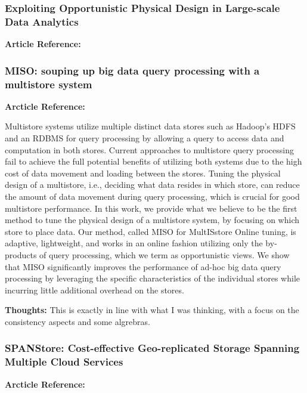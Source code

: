 \documentclass{article}
\begin{document}
\subsubsection{Exploiting Opportunistic Physical Design in Large-scale
               Data Analytics}

\textbf{Article Reference:} \cite{DBLP:journals/corr/abs-1303-6609}

\subsubsection{MISO: souping up big data query processing with a multistore system}

\textbf{Arcticle Reference:} \cite{LeFevre:2014:MSU:2588555.2588568}

Multistore systems utilize multiple distinct data stores such as Hadoop's HDFS and an RDBMS for query processing by allowing a query to access data and computation in both stores. Current approaches to multistore query processing fail to achieve the full potential benefits of utilizing both systems due to the high cost of data movement and loading between the stores. Tuning the physical design of a multistore, i.e., deciding what data resides in which store, can reduce the amount of data movement during query processing, which is crucial for good multistore performance. In this work, we provide what we believe to be the first method to tune the physical design of a multistore system, by focusing on which store to place data. Our method, called MISO for MultISstore Online tuning, is adaptive, lightweight, and works in an online fashion utilizing only the by-products of query processing, which we term as opportunistic views. We show that MISO significantly improves the performance of ad-hoc big data query processing by leveraging the specific characteristics of the individual stores while incurring little additional overhead on the stores.

\textbf{Thoughts:} This is exactly in line with what I was thinking, with a focus on the consistency aspects and some algrebras.

\subsubsection{SPANStore: Cost-effective Geo-replicated Storage Spanning Multiple Cloud Services}

\textbf{Arcticle Reference:} \cite{Wu:2013:SCG:2517349.2522730}
\end{document}
